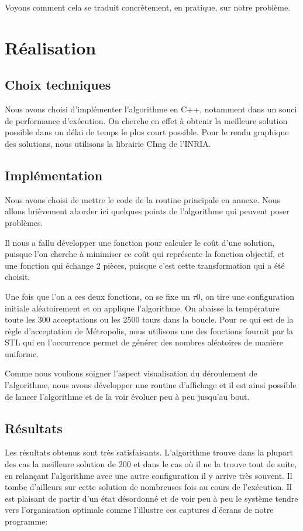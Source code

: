 \documentclass{report}
\begin{document}
Voyons comment cela se traduit concrètement, en pratique, sur notre problème.

\section{Réalisation}
\subsection{Choix techniques}
Nous avons choisi d'implémenter l'algorithme en C++, notamment dans un souci de performance d’exécution. On cherche en effet à obtenir la meilleure solution possible dans un délai de temps le plus court possible. Pour le rendu graphique des solutions, nous utilisons la librairie CImg de l'INRIA.

\subsection{Implémentation}
Nous avons choisi de mettre le code de la routine principale en annexe. Nous allons brièvement aborder ici quelques points de l’algorithme qui peuvent poser problèmes.

Il nous a fallu développer une fonction pour calculer le coût d'une solution, puisque l'on cherche à minimiser ce coût qui représente la fonction objectif, et une fonction qui échange 2 pièces, puisque c'est cette transformation qui a été choisit.

Une fois que l'on a ces deux fonctions, on se fixe un $\tau 0$, on tire une configuration initiale aléatoirement et on applique l'algorithme. On abaisse la température toute les 300 acceptations ou les 2500 tours dans la boucle. Pour ce qui est de la règle d'acceptation de Métropolis, nous utilisons une des fonctions fournit par la STL qui en l’occurrence permet de générer des nombres aléatoires de manière uniforme.

Comme nous voulions soigner l'aspect visualisation du déroulement de l'algorithme, nous avons développer une routine d'affichage et il est ainsi possible de lancer l'algorithme et de la voir évoluer peu à peu jusqu'au bout.

\subsection{Résultats}
Les résultats obtenus sont très satisfaisants. L'algorithme trouve dans la plupart des cas la meilleure solution de 200 et dans le cas où il ne la trouve tout de suite, en relançant l'algorithme avec une autre configuration il y arrive très souvent. Il tombe d'ailleurs sur cette solution de nombreuses fois au cours de l'exécution. Il est plaisant de partir d'un état désordonné et de voir peu à peu le système tendre vers l'organisation optimale comme l'illustre ces captures d'écrans de notre programme:\\
\end{document}
